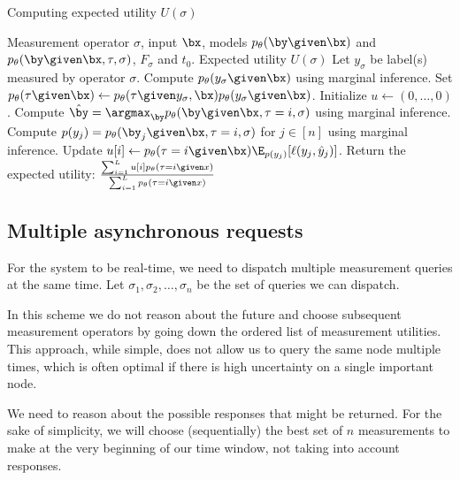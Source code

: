 \begin{algorithm}
\renewcommand{\algorithmicrequire}{\textbf{Input:}}
\renewcommand{\algorithmicensure}{\textbf{Output:}}
  \caption{Computing expected utility $U(\sigma)$}
  \label{algo:expected-utility}
  \begin{algorithmic}[1]
    \REQUIRE Measurement operator $\sigma$, input $\bx$, models $p_\theta(\by \given \bx)$ and $p_\theta(\by \given \bx, \tau, \sigma)$, $F_\sigma$ and $t_0$.
    \ENSURE Expected utility $U(\sigma)$
    \STATE Let $y_\sigma$ be label(s) measured by operator $\sigma$.
    \STATE Compute $p_\theta(y_\sigma \given \bx)$ using marginal inference.
    \STATE Set $p_\theta(\tau \given \bx) \gets p_\theta(\tau \given y_\sigma, \bx) p_\theta(y_\sigma \given \bx)$.
    \STATE Initialize $u \gets (0, \dots, 0)$.
    \STATE Compute $\byt = \argmax_{\by} p_\theta(\by \given \bx, \tau = i, \sigma)$ using marginal inference.
    \STATE Compute $p(y_j) = p_\theta(\by_j \given \bx, \tau = i, \sigma)$ for $j \in [n]$ using marginal inference.
    \STATE Update $u[i] \gets \p(\tau = i \given \bx) \E_{p(y_j)}[\ell(y_j, \yt_j)]$.
    \ENDFOR
    \STATE Return the expected utility: $\frac{\sum_{i=1}^L u[i] p_\theta(\tau = i \given x)}{\sum_{i=1}^L p_\theta(\tau = i \given x)}$
  \end{algorithmic}
\end{algorithm}

\subsection{Multiple asynchronous requests}
\label{sec:async}

For the system to be real-time, we need to dispatch multiple measurement queries at the same time.
Let $\sigma_1, \sigma_2, \dots, \sigma_n$ be the set of queries we can dispatch.

\begin{note}
In this scheme we do not reason about the future and choose subsequent measurement operators by going down the ordered list of measurement utilities.
This approach, while simple, does not allow us to query the same node multiple times, which is often optimal if there is high uncertainty on a single important node.
\end{note}

We need to reason about the possible responses that might be returned.
For the sake of simplicity, we will choose (sequentially) the best set of $n$ measurements to make at the very beginning of our time window, not taking into account responses.

